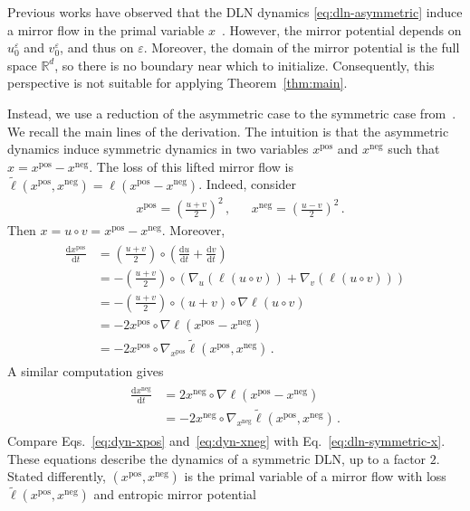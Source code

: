 \documentclass[11pt,english,reqno]{article}
\newcommand{\diff}{\mathrm{d}}
\newcommand{\R}{\mathbb{R}}
\newcommand{\pos}{\text{pos}}
\renewcommand{\neg}{\text{neg}}
\theoremstyle{plain}
\theoremstyle{definition}
\theoremstyle{remark}
\numberwithin{equation}{section}
\begin{document}
Previous works have observed that the DLN dynamics \eqref{eq:dln-asymmetric} induce a mirror flow in the primal variable $x$~\cite{woodworth2020kernel,pesme2023saddle}. However, the mirror potential depends on $u^\varepsilon_0$ and $v^\varepsilon_0$, and thus on $\varepsilon$. Moreover, the domain of the mirror potential is the full space $\R^d$, so there is no boundary near which to initialize. Consequently, this perspective is not suitable for applying Theorem~\ref{thm:main}.

Instead, we use a reduction of the asymmetric case to the symmetric case from~\cite{berthier2025diagonal}. We recall the main lines of the derivation. The intuition is that the asymmetric dynamics induce symmetric dynamics in two variables $x^\pos$ and $x^\neg$ such that $x = x^\pos - x^\neg$. The loss of this lifted mirror flow is $\widetilde{\ell}(x^\pos, x^\neg) = \ell(x^\pos - x^\neg)$. Indeed, consider
\begin{align*}
	&x^\pos = \left(\frac{u+v}{2}\right)^2 \, , && x^\neg = \left(\frac{u-v}{2}\right)^2 \, .
\end{align*}
Then $x = u \circ v = x^\pos - x^\neg$. Moreover, 
\begin{align}
	\label{eq:dyn-xpos}
	\begin{split}
	\frac{\diff x^\pos}{\diff t} &= \left(\frac{u+v}{2}\right) \circ \left(\frac{\diff u}{\diff t} + \frac{\diff v}{\diff t}\right) \\
	&= -\left(\frac{u+v}{2}\right) \circ \left(\nabla_u\left(\ell(u\circ v)\right) + \nabla_v\left(\ell(u\circ v)\right)\right) \\
	&= -\left(\frac{u+v}{2}\right) \circ (u+v) \circ \nabla \ell(u\circ v) \\
	&= -2 x^\pos \circ \nabla \ell(x^\pos - x^\neg) \\
	&= -2 x^\pos \circ \nabla_{x^\pos} \widetilde{\ell}(x^\pos, x^\neg) \, .
	\end{split}
\end{align}
A similar computation gives 
\begin{align}
	\label{eq:dyn-xneg}
	\begin{split}
	\frac{\diff x^\neg}{\diff t} &= 2 x^\neg \circ \nabla \ell(x^\pos - x^\neg) \\
	&= -2 x^\neg \circ \nabla_{x^\neg} \widetilde{\ell}(x^\pos, x^\neg) \, .
	\end{split}
\end{align}
Compare Eqs.~\eqref{eq:dyn-xpos} and~\eqref{eq:dyn-xneg} with Eq.~\eqref{eq:dln-symmetric-x}. These equations describe the dynamics of a symmetric DLN, up to a factor $2$. Stated differently, $(x^\pos, x^\neg)$ is the primal variable of a mirror flow with loss $\widetilde{\ell}(x^\pos, x^\neg)$ and entropic mirror potential
\end{document}
